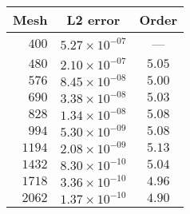 \begin{tabular}{|r||c|c|}
\hline
\bf{Mesh} & \bf{{L2 error}} & \bf{{Order}}\\
\hline
\hline
$ 400$ & $5.27\times 10^{-07}$ & ---\\
\hline
$ 480$ & $2.10\times 10^{-07}$ & $5.05$\\
\hline
$ 576$ & $8.45\times 10^{-08}$ & $5.00$\\
\hline
$ 690$ & $3.38\times 10^{-08}$ & $5.03$\\
\hline
$ 828$ & $1.34\times 10^{-08}$ & $5.08$\\
\hline
$ 994$ & $5.30\times 10^{-09}$ & $5.08$\\
\hline
$1194$ & $2.08\times 10^{-09}$ & $5.13$\\
\hline
$1432$ & $8.30\times 10^{-10}$ & $5.04$\\
\hline
$1718$ & $3.36\times 10^{-10}$ & $4.96$\\
\hline
$2062$ & $1.37\times 10^{-10}$ & $4.90$\\
\hline
\end{tabular}
